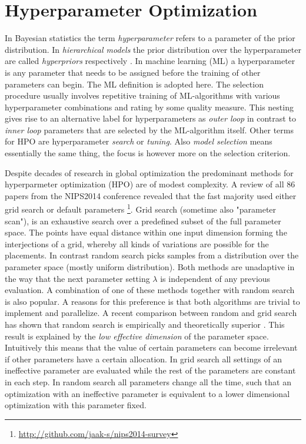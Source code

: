 \documentclass[english]{article}
\begin{document}
\section{Hyperparameter Optimization}
In Bayesian statistics the term \textit{hyperparameter} refers to a parameter of the prior distribution. In \textit{hierarchical models} the prior distribution over the hyperparameter are called \textit{hyperpriors} respectively \cite[p.408]{bishop_neural_1995}. In machine learning (ML) a hyperparameter is any parameter that needs to be assigned before the training of other parameters can begin. The ML definition is adopted here. The selection procedure usually involves repetitive training of ML-algorithms with various hyperparameter combinations and rating by some quality measure. This nesting gives rise to an alternative label for hyperparameters as \textit{outer loop} in contrast to \textit{inner loop} parameters that are selected by the ML-algorithm itself. Other terms for HPO are hyperparameter \textit{search} or \textit{tuning}. Also \textit{model selection} means essentially the same thing, the focus is however more on the selection criterion.

Despite decades of research in global optimization the predominant methods for hyperparmeter optimization (HPO) are of modest complexity. A review of all 86 papers from the NIPS2014 conference revealed that the fast majority used either grid search or default parameters \footnote{\url{http://github.com/jaak-s/nips2014-survey}}. Grid search (sometime also "parameter scan"), is an exhaustive search over a predefined subset of the full parameter space. The points have equal distance within one input dimension forming the interjections of a grid, whereby all kinds of variations are possible for the placements. In contrast random search picks samples from a distribution over the parameter space (mostly uniform distribution). Both methods are unadaptive in the way that the next parameter setting $\lambda$ is independent of any previous evaluation. A combination of one of these methods together with random search is also popular. A reasons for this preference is that both algorithms are trivial to implement and parallelize. A recent comparison between random and grid search has shown that random search is empirically and theoretically superior \cite{bergstra_random_2012}. This result is explained by the  \textit{low effective dimension} of the parameter space. Intuitively this means that the value of certain parameters can become irrelevant if other parameters have a certain allocation. In grid search all settings of an ineffective parameter are evaluated while the rest of the parameters are constant in each step. In random search all parameters change all the time, such that an optimization with an ineffective parameter is equivalent to a lower dimensional optimization with this parameter fixed.
\end{document}
